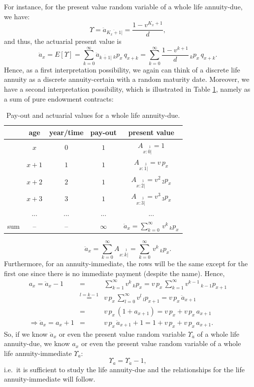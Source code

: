 \documentclass[11pt,fleqn,oneside]{book}
\begin{document}
For instance, for the present value random variable of a whole life annuity-due, we have:
$$
\Upsilon = \ddot{a}_{\overline{K_x+1}|} = \frac{1 - v^{K_x+1}}{d},
$$
and thus, the actuarial present value is
$$
\ddot{a}_x = E[\Upsilon] = \sum_{k=0}^{\infty} \ddot{a}_{\overline{k+1}|}\,{_kp_x}\,q_{x+k}
=  \sum_{k=0}^{\infty} \frac{1 - v^{k+1}}{d}\,{_kp_x}\,q_{x+k}.
$$
Hence, as a first interpretation possibility, we again can think of a discrete life annuity as a discrete annuity-certain with a random maturity date. Moreover, we have a second interpretation possibility, which is illustrated in Table \ref{TABDISLIFEANNINT2}, namely as a sum of pure endowment contracts:
\begin{table}[hbt]
\begin{center}
\begin{tabular}{|| l |c|c|c|c||}
\hline
\hline
 & age & year/time & pay-out & present value \\
\hline
& $x$ & $0$ & $1$ &$A_{x:\stackrel{1}{\overline{0}|}} = 1$\\
& $x+1$ & $1$ & $1$& $A_{x:\stackrel{1}{\overline{1}|}} = v\,p_x$\\
& $x+2$ & $2$ & $1$ &$A_{x:\stackrel{1}{\overline{2}|}} = v^2\,{_2p_x}$\\
& $x+3$ & $3$ & $1$ &$A_{x:\stackrel{1}{\overline{3}|}} = v^3\,{_3p_x}$\\
& ... & ... & ... & ...\\
sum & -- & -- & $\infty$ & $\ddot{a}_x = \sum_{k=0}^{\infty}\,v^k\,{_kp_x}$ \\
\hline
\hline
\end{tabular}
\caption{Pay-out and actuarial values for a whole life annuity-due.\label{TABDISLIFEANNINT2}}
\end{center}
\end{table}
$$
\ddot{a}_x = \sum_{k=0}^{\infty} A_{x:\stackrel{1}{\overline{k}|}} = \sum_{k=0}^{\infty}\,v^k\,{_kp_x}.
$$
Furthermore, for an annuity-immediate, the rows will be the same except for the first one since there is no immediate payment (despite the name). Hence,
\begin{eqnarray*}
a_x = \ddot{a}_x - 1 &=& \sum_{k=1}^{\infty} v^k\,{_kp_x} = v\,p_x\, \sum_{k=1}^{\infty} v^{k-1}\,{_{k-1}p_{x+1}}\\
&\stackrel{l=k-1}{=}& v\,p_x\, \sum_{l=0}^{\infty} v^{l}\,{_{l}p_{x+1}} = v\,p_x\,\ddot{a}_{x+1} \\
&=& v\,p_x\,\left(1 + a_{x+1}\right) = v\,p_x + v\,p_x\,a_{x+1}\\
\Rightarrow \ddot{a}_{x} = a_x + 1&=&  v\,p_x\,\ddot{a}_{x+1} + 1 = 1 + v\,p_x + v\,p_x\,a_{x+1}.
\end{eqnarray*}
So, if we know $\ddot{a}_x$ or even the present value random variable $\Upsilon_{\ddot{a}}$ of a whole life annuity-due, we know $a_x$ or even the present value random variable of a whole life annuity-immediate $\Upsilon_a$:
$$
\Upsilon_a = \Upsilon_{\ddot{a}} - 1,
$$
i.e.\ it is sufficient to study the life annuity-due and the relationships for the life annuity-immediate will follow.
\end{document}
